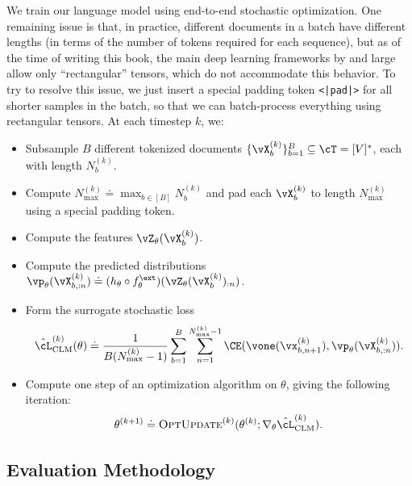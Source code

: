 \documentclass[../../book-main.tex]{subfiles}
\begin{document}
We train our language model using end-to-end stochastic optimization.
One remaining issue is that, in practice, different documents in a
batch have different lengths (in terms of the number of tokens
required for each sequence), but as of the time of writing this book,
the main deep learning frameworks by and large allow only
``rectangular'' tensors, which do not accommodate this behavior. To
try to resolve this issue, we just insert a special padding token
\texttt{<|pad|>} for all shorter samples in the batch, so that we can
batch-process everything using rectangular tensors. At each timestep \(k\), we:
\begin{itemize}
\item Subsample \(B\) different tokenized documents
    \(\{\vX_{b}^{(k)}\}_{b = 1}^{B} \subseteq \cT = [V]^{*}\), each
    with length \(N_{b}^{(k)}\).
\item Compute \(N_{\max}^{(k)} \doteq \max_{b \in [B]}N_{b}^{(k)}\)
    and pad each \(\vX_{b}^{(k)}\) to length \(N_{\max}^{(k)}\) using
    a special padding token.
\item Compute the features \(\vZ_{\theta}(\vX_{b}^{(k)})\).
\item Compute the predicted distributions \(\vp_{\theta}(\vX_{b,
        :n}^{(k)}) \doteq (h_{\theta} \circ
    f_{\theta}^{\ext})(\vZ_{\theta}(\vX_{b}^{(k)})_{:n})\).
\item Form the surrogate stochastic loss
    \begin{equation}
        \hat{\cL}_{\mathrm{CLM}}^{(k)}(\theta) \doteq
        \frac{1}{B(N_{\max}^{(k)} - 1)}\sum_{b = 1}^{B}\sum_{n =
        1}^{N_{\max}^{(k)}-1}\CE(\vone(\vx_{b, n + 1}^{(k)}),
    \vp_{\theta}(\vX_{b, :n}^{(k)})) .
    \end{equation}
\item Compute one step of an optimization algorithm on \(\theta\),
giving the following iteration:
\begin{equation}
    \theta^{(k + 1)} \doteq \textsc{OptUpdate}^{(k)}(\theta^{(k)};
    \nabla_{\theta}\hat{\cL}_{\mathrm{CLM}}^{(k)}) .
\end{equation}
\end{itemize}

\subsection{Evaluation Methodology} \label{sub:clm_text_evals}
\end{document}
